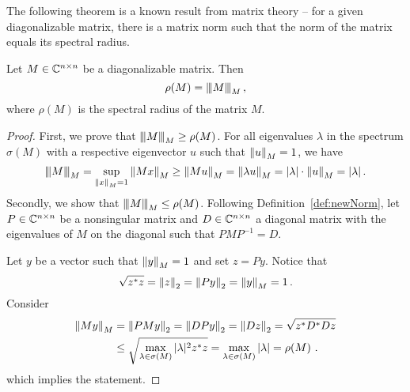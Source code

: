 The following theorem is a known result from matrix theory -- for a given diagonalizable matrix, there is a matrix norm such that the norm of the matrix equals its spectral radius.

\begin{thm}
\label{thm:norm}
Let $M\in\CC^{n\times n}$ be a diagonalizable matrix. Then %
$$
\rho(M)=\Mnorm{M}{M}\,,
$$
where $\rho(M)$ is the spectral radius of the matrix $M$. %
\end{thm}
\begin{proof}
First, we prove that $\Mnorm{M}{M}\geq\rho(M)$. For all eigenvalues $\lambda$ in the spectrum $\sigma(M)$ with a respective eigenvector $u$ such that $\norm{u}{M}=1$, we have
$$
\Mnorm{M}{M}=\sup_{\norm{x}{M}=1} \norm{Mx}{M}\geq \norm{Mu}{M}=\norm{\lambda u}{M}=|\lambda|\cdot\norm{u}{M}=|\lambda|\,.
$$
Secondly, we show that $\Mnorm{M}{M}\leq\rho(M)$. Following Definition~\ref{def:newNorm}, let $P\in\CC^{n\times n}$ be a  nonsingular matrix  and $D\in\CC^{n\times n}$ a diagonal matrix  with the eigenvalues of $M$ on the diagonal such that $PMP^{-1}=D$.

Let $y$ be a  vector such that $\norm{y}{M}=1$ and set $z=Py$. Notice that 
$$
\sqrt{z^*z}=\norm{z}{2}=\norm{Py}{2}=\norm{y}{M}=1\,.
$$
Consider
\begin{align*}
\norm{My}{M}&=\norm{PMy}{2}=\norm{DPy}{2}=\norm{Dz}{2}=\sqrt{z^*D^*Dz}\\
    &\leq \sqrt{\max_{\lambda\in\sigma(M)}|\lambda|^2 z^*z}=\max_{\lambda\in\sigma(M)}|\lambda|=\rho(M)\,\,.
\end{align*}
which implies the statement.
\end{proof}


